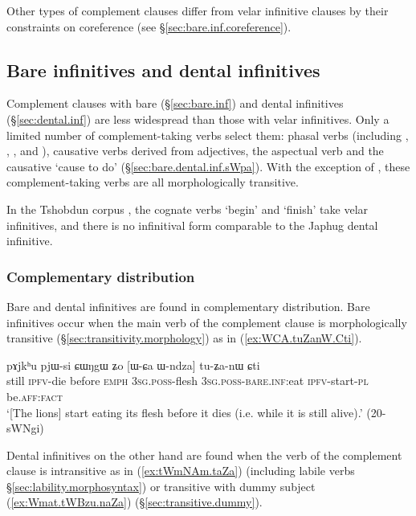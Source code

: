 Other types of complement clauses differ from velar infinitive clauses by their constraints on coreference (see §\ref{sec:bare.inf.coreference}).

 \subsection{Bare infinitives and dental infinitives} \label{sec:bare.dental.inf}
Complement clauses with bare (§\ref{sec:bare.inf}) and dental infinitives (§\ref{sec:dental.inf}) are less widespread than those with velar infinitives. Only a limited number of com\-ple\-ment-taking verbs select them: phasal verbs (including , , , and ), causative verbs derived from adjectives, the aspectual verb  and the causative  `cause to do' (§\ref{sec:bare.dental.inf.sWpa}). With the exception of , these com\-ple\-ment-taking verbs are all morphologically transitive.

In the Tshobdun corpus \citet{jackson19tshobdun}, the cognate verbs  `begin'  and  `finish' take velar infinitives, and there is no infinitival form comparable to the Japhug dental infinitive.

\subsubsection{Complementary distribution} \label{sec:bare.inf.dental.complementary}
Bare and dental infinitives are found in complementary distribution. Bare infinitives occur when the main verb of the complement clause is morphologically transitive (§\ref{sec:transitivity.morphology}) as in (\ref{ex:WCA.tuZanW.Cti}).

\begin{exe} 
\ex \label{ex:WCA.tuZanW.Cti}
\gll pɤjkʰu pjɯ-si ɕɯŋgɯ ʑo [ɯ-ɕa ɯ-ndza] tu-ʑa-nɯ ɕti \\
still \textsc{ipfv}-die before \textsc{emph} \textsc{3sg}.\textsc{poss}-flesh \textsc{3sg}.\textsc{poss}-\textsc{bare}.\textsc{inf}:eat \textsc{ipfv}-start-\textsc{pl} be.\textsc{aff}:\textsc{fact} \\
\glt `[The lions] start eating its flesh before it dies (i.e. while it is still alive).' (20-sWNgi)
  \end{exe} 

Dental infinitives on the other hand are  found when the verb of the complement clause is intransitive as in (\ref{ex:tWmNAm.taZa}) (including labile verbs §\ref{sec:lability.morphosyntax}) or transitive with dummy subject (\ref{ex:Wmat.tWBzu.naZa}) (§\ref{sec:transitive.dummy}).

